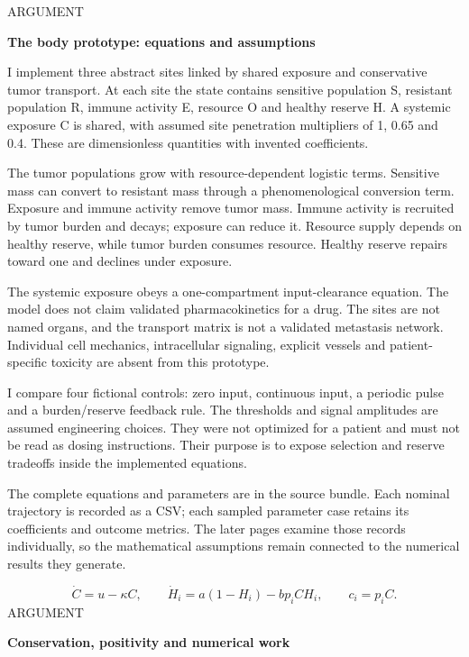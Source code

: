 \documentclass[10pt]{article}
\begin{document}
\clearpage
\hypertarget{p14}{}
{\small\color{accent}\MakeUppercase{Argument}}\par
{\LARGE\bfseries\color{ink}The body prototype: equations and assumptions}\par\vspace{5pt}
I implement three abstract sites linked by shared exposure and conservative tumor transport. At each site the state contains sensitive population S, resistant population R, immune activity E, resource O and healthy reserve H. A systemic exposure C is shared, with assumed site penetration multipliers of 1, 0.65 and 0.4. These are dimensionless quantities with invented coefficients.\par
The tumor populations grow with resource-dependent logistic terms. Sensitive mass can convert to resistant mass through a phenomenological conversion term. Exposure and immune activity remove tumor mass. Immune activity is recruited by tumor burden and decays; exposure can reduce it. Resource supply depends on healthy reserve, while tumor burden consumes resource. Healthy reserve repairs toward one and declines under exposure.\par
The systemic exposure obeys a one-compartment input-clearance equation. The model does not claim validated pharmacokinetics for a drug. The sites are not named organs, and the transport matrix is not a validated metastasis network. Individual cell mechanics, intracellular signaling, explicit vessels and patient-specific toxicity are absent from this prototype.\par
I compare four fictional controls: zero input, continuous input, a periodic pulse and a burden/reserve feedback rule. The thresholds and signal amplitudes are assumed engineering choices. They were not optimized for a patient and must not be read as dosing instructions. Their purpose is to expose selection and reserve tradeoffs inside the implemented equations.\par
The complete equations and parameters are in the source bundle. Each nominal trajectory is recorded as a CSV; each sampled parameter case retains its coefficients and outcome metrics. The later pages examine those records individually, so the mathematical assumptions remain connected to the numerical results they generate.\par
\[\dot C=u-\kappa C,\qquad\dot H_i=a(1-H_i)-b p_i C H_i,\qquad c_i=p_iC.\]
\clearpage
\hypertarget{p15}{}
{\small\color{accent}\MakeUppercase{Argument}}\par
{\LARGE\bfseries\color{ink}Conservation, positivity and numerical work}\par\vspace{5pt}
\end{document}
